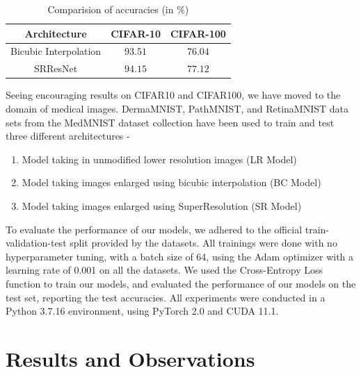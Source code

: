 \documentclass[10pt,twocolumn,letterpaper]{article}
\begin{document}
\begin{table} 
    \begin{center}
    \begin{tabular}{|| c | c | c ||}
        \hline
        Architecture & CIFAR-10 & CIFAR-100 \\
        \hline\hline
        Bicubic Interpolation & $93.51$  & $76.04$ \\
        \hline
        SRResNet &  $\mathbf{94.15} $ & $\mathbf{77.12}$ \\
        \hline
    \end{tabular}
    
    \caption{Comparision of accuracies (in \%) }
    \label{tab:my_label}
    \end{center}
\end{table}

Seeing encouraging results on CIFAR10 and CIFAR100, we have moved to the domain of medical images. DermaMNIST, PathMNIST, and RetinaMNIST data sets from the MedMNIST \cite{medmnistv2} dataset collection  have been used to train and test three different architectures -
\begin{enumerate}
    \item Model taking in unmodified lower resolution images (LR Model)
    \item Model taking images enlarged using bicubic interpolation (BC Model)
    \item Model taking images enlarged using SuperResolution (SR Model)
\end{enumerate}

To evaluate the performance of our models, we adhered to the official train-validation-test split provided by the datasets.
All trainings were done with no hyperparameter tuning, with a batch size of 64, using the Adam optimizer with a learning rate of 0.001 on all the datasets. We used the Cross-Entropy Loss function to train our models, and evaluated the performance of our models on the test set, reporting the test accuracies. All experiments were conducted in a Python 3.7.16 environment, using PyTorch 2.0 and CUDA 11.1.

\section{Results and Observations}
\end{document}
